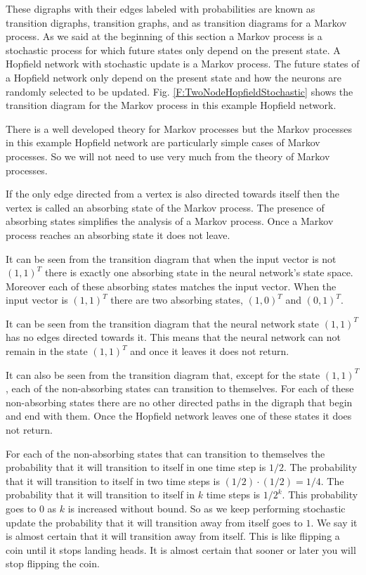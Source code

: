    These digraphs with their edges labeled with probabilities are known as 
transition digraphs, transition graphs, and as transition diagrams for a Markov
process.  As we said at the beginning of this section a Markov process is a 
stochastic process for which future states only depend on the present state.  A 
Hopfield network with stochastic update is a Markov process.  The future states 
of a Hopfield network only depend on the present state and how the neurons are 
randomly selected to be updated.  Fig. \ref{F:TwoNodeHopfieldStochastic} shows 
the transition diagram for the Markov process in this example Hopfield network.

   There is a well developed theory for Markov processes but the Markov
processes in this example Hopfield network are particularly simple cases of 
Markov processes.  So we will not need to use very much from the theory of 
Markov processes.

   If the only edge directed from a vertex is also directed towards itself then
the vertex is called an absorbing state of the Markov process.  The presence of
absorbing states simplifies the analysis of a Markov process.  Once a Markov 
process reaches an absorbing state it does not leave.  

   It can be seen from the transition diagram that when the input vector is not 
$(1,1)^T$ there is exactly one absorbing state in the neural network's state 
space.  Moreover each of these absorbing states matches the input vector.  When 
the input vector is $(1,1)^T$ there are two absorbing states, $(1,0)^T$ and 
$(0,1)^T$.

   It can be seen from the transition diagram that the neural network state 
$(1,1)^T$ has no edges directed towards it.  This means that the neural 
network can not remain in the state $(1,1)^T$ and once it leaves it does not 
return.

  It can also be seen from the transition diagram that, except for the state
$(1,1)^T$, each of the non-absorbing states can transition to themselves.  For 
each of these non-absorbing states there are no other directed paths in the 
digraph that begin and end with them.  Once the Hopfield network leaves one of these states it does not return.

   For each of the non-absorbing states that can transition to themselves the
probability that it will transition to itself in one time step is $1/2$.  The
probability that it will transition to itself in two time steps is $(1/2) \cdot
(1/2) = 1/4$.  The probability that it will transition to itself in $k$ time 
steps is $1/2^k$.  This probability goes to $0$ as $k$ is increased without
bound.  So as we keep performing stochastic update the probability that it
will transition away from itself goes to $1$.  We say it is almost certain that
it will transition away from itself.  This is like flipping a coin until it
stops landing heads.  It is almost certain that sooner or later you will stop 
flipping the coin.


